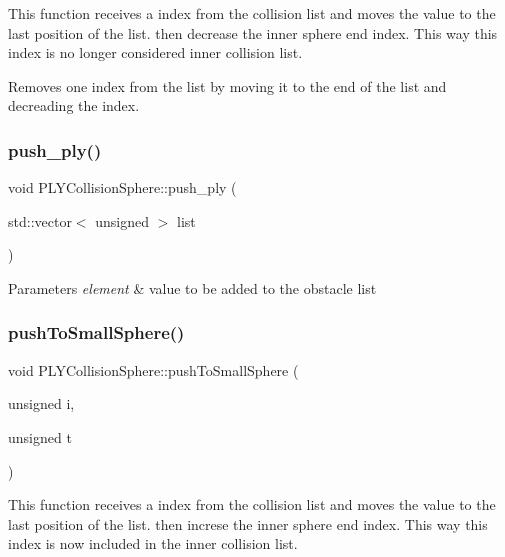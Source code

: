 This function receives a index from the collision list and moves the value to the last position of the list. then decrease the inner sphere end index. This way this index is no longer considered inner collision list. 

Removes one index from the list by moving it to the end of the list and decreading the index. \mbox{\label{class_p_l_y_collision_sphere_a10e46dea74b839faf34872028eafae46}} 
\subsubsection{\texorpdfstring{push\+\_\+ply()}{push\_ply()}}
{\footnotesize\ttfamily void P\+L\+Y\+Collision\+Sphere\+::push\+\_\+ply (\begin{DoxyParamCaption}\item[{std\+::vector$<$ unsigned $>$}]{list }\end{DoxyParamCaption})}


\begin{DoxyParams}{Parameters}
{\em element} & value to be added to the obstacle list \\
\hline
\end{DoxyParams}
\mbox{\label{class_p_l_y_collision_sphere_a546ea2c6fe80908502fba0350c4f9726}} 
\subsubsection{\texorpdfstring{push\+To\+Small\+Sphere()}{pushToSmallSphere()}}
{\footnotesize\ttfamily void P\+L\+Y\+Collision\+Sphere\+::push\+To\+Small\+Sphere (\begin{DoxyParamCaption}\item[{unsigned}]{i,  }\item[{unsigned}]{t }\end{DoxyParamCaption})}



This function receives a index from the collision list and moves the value to the last position of the list. then increse the inner sphere end index. This way this index is now included in the inner collision list. 

